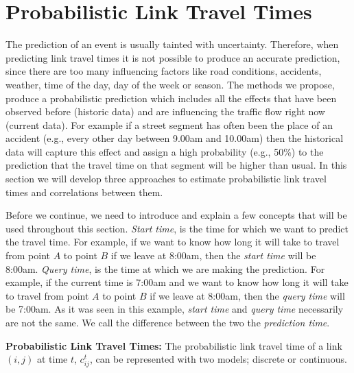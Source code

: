 \section{Probabilistic Link Travel Times}
\label{sec:lttestimation} 
The prediction of an event is usually tainted with uncertainty. Therefore, when
predicting link travel times it is not possible to produce an accurate
prediction, since there are too many influencing factors like road conditions,
accidents, weather, time of the day, day of the week or season. The methods we
propose, produce a probabilistic prediction which includes all the effects that
have been observed before (historic data) and are influencing the traffic flow
right now (current data). For example if a street segment has often been the
place of an accident (e.g., every other day between 9.00am and 10.00am) then the
historical data will capture this effect and assign a high probability (e.g.,
50\%) to the prediction that the travel time on that segment will be higher than
usual. In this section we will develop three approaches to estimate
probabilistic link travel times and correlations between them.

Before we continue, we need to introduce and explain a few concepts that will be
used throughout this section. \textit{Start time}, is the time for which we want
to predict the travel time. For example, if we want to know how long it will
take to travel from point $A$ to point $B$ if we leave at 8:00am, then the
\textit{start time} will be 8:00am. \textit{Query time}, is the time at which we
are making the prediction. For example, if the current time is 7:00am and we
want to know how long it will take to travel from point $A$ to point $B$ if we
leave at 8:00am, then the \textit{query time} will be 7:00am. As it was seen in
this example, \textit{start time} and \textit{query time} necessarily are not
the same. We call the difference between the two the \textit{prediction time}.


\textbf{Probabilistic Link Travel Times: } The probabilistic link travel time of a link $(i,j)$ at time $t$, $c_{ij}^t$,
can be represented with two models; discrete or continuous.


